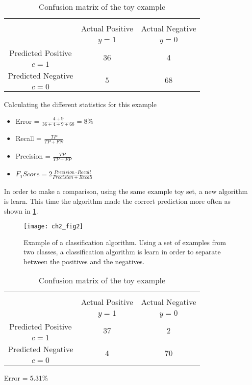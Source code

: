   
  	\begin{table}[!t]
		\centering
		\footnotesize
    \begin{tabular}{c|c|c}
      \multicolumn{3}{c}{}\\
			\multicolumn{1}{c|}{}  & Actual Positive& Actual Negative \\
			\multicolumn{1}{c|}{} & $y=1$& $y=0$ \\
			\hline
			Predicted Positive 		& \multirow{ 2}{*}{36} & \multirow{ 
			2}{*}{4} \\
			$c=1$ & &\\
			\hline
			Predicted Negative  	& \multirow{ 2}{*}{5} & \multirow{ 
			2}{*}{68} \\
			$c=0$ & &\\
		\end{tabular}
		\caption{Confusion matrix of the toy example}
		\label{tab:ch2:2}
  \end{table}  
  
  Calculating the different statistics for this example
  	\begin{itemize}
  	\item Error = $\frac{4+9}{36+4+9+68}=8\%$
		\item Recall = $\frac{TP}{TP+FN}$
		\item Precision = $\frac{TP}{TP+FP}$
		\item $F_1Score = 2\frac{Precision \cdot Recall}{Precision + Recall}$
	\end{itemize}
	
	In order to make a comparison, using the same example toy set, a new algorithm is learn. This 
time the algorithm made the correct prediction more often as shown in \figurename{ \ref{fig:ch2:2}}.

\begin{figure}[t!]
	\centering
	\texttt{[image: ch2\_fig2]}
	\caption{Example of a classification algorithm. Using a set of examples from two classes, a 
	classification algorithm is learn in order to separate between the positives and the negatives. }
	\label{fig:ch2:2}
\end{figure}

    	\begin{table}[!t]
		\centering
		\footnotesize
    \begin{tabular}{c|c|c}
      \multicolumn{3}{c}{}\\
			\multicolumn{1}{c|}{}  & Actual Positive& Actual Negative \\
			\multicolumn{1}{c|}{} & $y=1$& $y=0$ \\
			\hline
			Predicted Positive 		& \multirow{ 2}{*}{37} & \multirow{ 
			2}{*}{2} \\
			$c=1$ & &\\
			\hline
			Predicted Negative  	& \multirow{ 2}{*}{4} & \multirow{ 
			2}{*}{70} \\
			$c=0$ & &\\
		\end{tabular}
		\caption{Confusion matrix of the toy example}
		\label{tab:ch2:2}
  \end{table}  
  Error = 5.31\%
  
